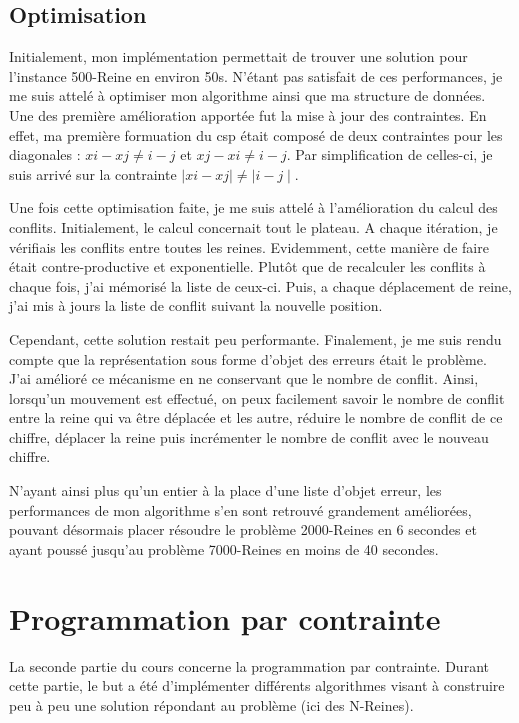 \documentclass[a4paper,10pt]{article}
\begin{document}
\subsection{Optimisation}

Initialement, mon implémentation permettait de trouver une solution pour l'instance 500-Reine en environ 50s. N'étant pas satisfait de ces performances, je me suis attelé à optimiser mon algorithme ainsi que ma structure de données. Une des première amélioration apportée fut la mise à jour des contraintes. En effet, ma première formuation du csp était composé de deux contraintes pour les diagonales : $xi - xj  \neq  i - j$ et $xj - xi  \neq  i - j$. Par simplification de celles-ci, je suis arrivé sur la contrainte $\mid xi - xj\mid \neq \mid i - j\mid $.

Une fois cette optimisation faite, je me suis attelé à l'amélioration du calcul des conflits. Initialement, le calcul concernait tout le plateau. A chaque itération, je vérifiais les conflits entre toutes les reines. Evidemment, cette manière de faire était contre-productive et exponentielle. Plutôt que de recalculer les conflits à chaque fois, j'ai mémorisé la liste de ceux-ci. Puis, a chaque déplacement de reine, j'ai mis à jours la liste de conflit suivant la nouvelle position.

Cependant, cette solution restait peu performante. Finalement, je me suis rendu compte que la représentation sous forme d'objet des erreurs était le problème. J'ai amélioré ce mécanisme en ne conservant que le nombre de conflit. Ainsi, lorsqu'un mouvement est effectué, on peux facilement savoir le nombre de conflit entre la reine qui va être déplacée et les autre, réduire le nombre de conflit de ce chiffre, déplacer la reine puis incrémenter le nombre de conflit avec le nouveau chiffre.

N'ayant ainsi plus qu'un entier à la place d'une liste d'objet erreur, les performances de mon algorithme s'en sont retrouvé grandement améliorées, pouvant désormais placer résoudre le problème 2000-Reines en 6 secondes et ayant poussé jusqu'au problème 7000-Reines en moins de 40 secondes.

\section{Programmation par contrainte}

La seconde partie du cours concerne la programmation par contrainte. Durant cette partie, le but a été d'implémenter différents algorithmes visant à construire peu à peu une solution répondant au problème (ici des N-Reines).
\end{document}
